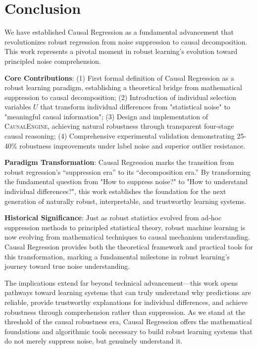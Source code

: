 \documentclass[conference]{IEEEtran}
\newcommand{\causalengine}{\textsc{CausalEngine}}
\begin{document}
\section{Conclusion}
\label{sec:conclusion}

We have established Causal Regression as a fundamental advancement that revolutionizes robust regression from noise suppression to causal decomposition. This work represents a pivotal moment in robust learning's evolution toward principled noise comprehension.

\textbf{Core Contributions}: (1) First formal definition of Causal Regression as a robust learning paradigm, establishing a theoretical bridge from mathematical suppression to causal decomposition; (2) Introduction of individual selection variables $U$ that transform individual differences from "statistical noise" to "meaningful causal information"; (3) Design and implementation of \causalengine{}, achieving natural robustness through transparent four-stage causal reasoning; (4) Comprehensive experimental validation demonstrating 25-40\% robustness improvements under label noise and superior outlier resistance.

\textbf{Paradigm Transformation}: Causal Regression marks the transition from robust regression's ``suppression era'' to its ``decomposition era.'' By transforming the fundamental question from "How to suppress noise?" to "How to understand individual differences?", this work establishes the foundation for the next generation of naturally robust, interpretable, and trustworthy learning systems.

\textbf{Historical Significance}: Just as robust statistics evolved from ad-hoc suppression methods to principled statistical theory, robust machine learning is now evolving from mathematical techniques to causal mechanism understanding. Causal Regression provides both the theoretical framework and practical tools for this transformation, marking a fundamental milestone in robust learning's journey toward true noise understanding.

The implications extend far beyond technical advancement—this work opens pathways toward learning systems that can truly understand why predictions are reliable, provide trustworthy explanations for individual differences, and achieve robustness through comprehension rather than suppression. As we stand at the threshold of the causal robustness era, Causal Regression offers the mathematical foundations and algorithmic tools necessary to build robust learning systems that do not merely suppress noise, but genuinely understand it.
\end{document}

